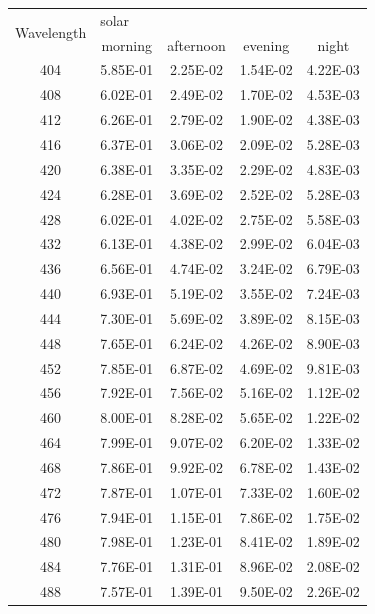 \begin{longtable}{c||c|c|c|c}
    \multirow{2}{*}{Wavelength} & \multicolumn{4}{l}{\gls{solar}} \\ \cline{2-4}
        	& morning & afternoon & evening & night \\ \hline \hline
        404 & 5.85E-01 & 2.25E-02 & 1.54E-02 & 4.22E-03 \\ \hline
        408 & 6.02E-01 & 2.49E-02 & 1.70E-02 & 4.53E-03 \\ \hline
        412 & 6.26E-01 & 2.79E-02 & 1.90E-02 & 4.38E-03 \\ \hline
        416 & 6.37E-01 & 3.06E-02 & 2.09E-02 & 5.28E-03 \\ \hline
        420 & 6.38E-01 & 3.35E-02 & 2.29E-02 & 4.83E-03 \\ \hline
        424 & 6.28E-01 & 3.69E-02 & 2.52E-02 & 5.28E-03 \\ \hline
        428 & 6.02E-01 & 4.02E-02 & 2.75E-02 & 5.58E-03 \\ \hline
        432 & 6.13E-01 & 4.38E-02 & 2.99E-02 & 6.04E-03 \\ \hline
        436 & 6.56E-01 & 4.74E-02 & 3.24E-02 & 6.79E-03 \\ \hline
        440 & 6.93E-01 & 5.19E-02 & 3.55E-02 & 7.24E-03 \\ \hline
        444 & 7.30E-01 & 5.69E-02 & 3.89E-02 & 8.15E-03 \\ \hline
        448 & 7.65E-01 & 6.24E-02 & 4.26E-02 & 8.90E-03 \\ \hline
        452 & 7.85E-01 & 6.87E-02 & 4.69E-02 & 9.81E-03 \\ \hline
        456 & 7.92E-01 & 7.56E-02 & 5.16E-02 & 1.12E-02 \\ \hline
        460 & 8.00E-01 & 8.28E-02 & 5.65E-02 & 1.22E-02 \\ \hline
        464 & 7.99E-01 & 9.07E-02 & 6.20E-02 & 1.33E-02 \\ \hline
        468 & 7.86E-01 & 9.92E-02 & 6.78E-02 & 1.43E-02 \\ \hline
        472 & 7.87E-01 & 1.07E-01 & 7.33E-02 & 1.60E-02 \\ \hline
        476 & 7.94E-01 & 1.15E-01 & 7.86E-02 & 1.75E-02 \\ \hline
        480 & 7.98E-01 & 1.23E-01 & 8.41E-02 & 1.89E-02 \\ \hline
        484 & 7.76E-01 & 1.31E-01 & 8.96E-02 & 2.08E-02 \\ \hline
        488 & 7.57E-01 & 1.39E-01 & 9.50E-02 & 2.26E-02 \\ \hline

\end{longtable}
